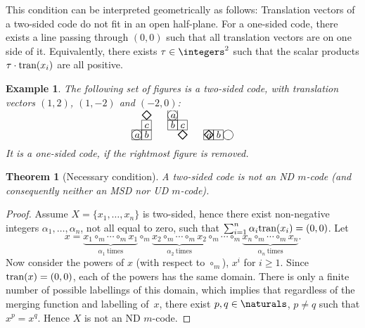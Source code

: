 \documentclass[final,nomarks]{dmtcs-episciences}
\newcommand{\dfimglabel}[3]{
    \put(#1,#2){
        \put(0,0){\line(1,0){10}}
        \put(0,0){\line(0,1){10}}
        \put(10,10){\line(-1,0){10}}
        \put(10,10){\line(0,-1){10}}
        \put(3,2){$#3$}
    }
}
\newcommand{\dfimgbegin}[2]{
    \put(#1,#2){
        \put(5,5){\circle{10}}
    }
}
\newcommand{\dfimgend}[2]{
    \put(#1,#2){
        \put(0,0){{\huge $\diamond$}}
    }
}
\newcommand{\dfimgbeginlabel}[3]{
    \dfimglabel{#1}{#2}{#3}
    \dfimgbegin{#1}{#2}
}
\newcommand{\dfimgendlabel}[3]{
    \dfimglabel{#1}{#2}{#3}
    \dfimgend{#1}{#2}
}
\newcommand{\dftransition}[1]{\mbox{\rm tran}(#1)}
\newtheorem{theorem}{Theorem}
\newtheorem{example}{Example}
\begin{document}
This condition can be interpreted geometrically as follows:
Translation vectors of a two-sided code do not fit in an open
half-plane. For a one-sided code, there exists a line passing
through $(0,0)$ such that all translation vectors are on one
side of it. Equivalently, there exists $\tau\in\integers^2$ such that 
the scalar products $\tau\cdot\dftransition{x_i}$ are all positive.

\begin{example}
The following set of figures is a two-sided code, with translation vectors 
$(1,2)$, $(1,-2)$ and $(-2,0)$:
\begin{displaymath}
\begin{picture}(20,25)
    \dfimgbeginlabel{00}{00}{a}
    \dfimglabel{10}{00}{b}
    \dfimglabel{10}{10}{c}
    \dfimgend{10}{20}
\end{picture}~~~~~
\begin{picture}(20,25)
    \dfimgbeginlabel{00}{20}{a}
    \dfimglabel{00}{10}{b}
    \dfimglabel{10}{10}{c}
    \dfimgend{10}{00}
\end{picture}~~~~~
\begin{picture}(30,25)
    \dfimgendlabel{00}{00}{a}
    \dfimglabel{10}{00}{b}
    \dfimgbegin{20}{00}
\end{picture}
\end{displaymath}
It is a one-sided code, if the rightmost figure is removed.
\end{example}


\begin{theorem}[Necessary condition]\label{thm:easyNonCodes}
A two-sided code is not an ND $m$-code (and consequently neither 
an MSD nor UD $m$-code).
\end{theorem}


\begin{proof}
Assume $X=\{x_1,\ldots,x_n\}$ is two-sided, hence there exist
non-negative integers $\alpha_1,\ldots,\alpha_n$, not all equal to zero, 
such that $\sum_{i=1}^n\alpha_i\dftransition{x_i}=(0,0)$.
Let
\begin{displaymath}
    x=\underbrace{x_1\circ_m\cdots\circ_m x_1}_{\alpha_1\mathrm{~times}}\circ_m
      \underbrace{x_2\circ_m\cdots\circ_m x_2}_{\alpha_2\mathrm{~times}}\circ_m
      \cdots\circ_m
      \underbrace{x_n\circ_m\cdots\circ_m x_n}_{\alpha_n\mathrm{~times}}.
\end{displaymath}
Now consider the powers of $x$ (with respect to $\circ_m$),
$x^i$ for $i\ge 1$. Since $\dftransition{x}=(0,0)$, each of the powers
has the same domain. There is only a finite number of possible
labellings of this domain, which implies that regardless of the
merging function and labelling of~$x$, there exist
$p,q\in\naturals$, $p \neq q$ such that $x^p=x^q$. Hence $X$ is
not an ND $m$-code.
\end{proof}
\end{document}
